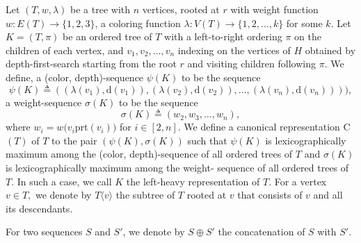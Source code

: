 \documentclass[12pt]{article}
\renewcommand{\d}{${\rm d}$}
\newcommand{\prt}{${\rm prt}$}
\newcommand{\1}{\pmb{1}}
\newcommand{\0}{\pmb{0}}
\renewcommand{\d}{\mathrm d}
\begin{document}
 
 Let $(T,w, \lambda)$ be a tree with $n$ vertices, 
 rooted at $r$ with weight function
 $w : E(T) \to \{1, 2, 3\}$, a  coloring function 
 $\lambda : V(T) \to \{1, 2, \ldots, k\}$ for some 
 $k$. 
Let $K= (T, \pi)$ be an ordered tree of $T$ with a left-to-right ordering $\pi$ 
on the children of each vertex, and 
$v_1, v_2, \ldots, v_n$ indexing on the vertices of $H$ obtained by 
depth-first-search starting from the root $r$ and 
visiting children following $\pi$. 
We define, a (color, depth)-sequence $\psi(K)$ to be the sequence
\[
\psi(K) \triangleq (( \lambda(v_1), \d(v_1)), (\lambda(v_2), \d(v_2)), \ldots, (\lambda(v_n), \d(v_n)))), 
\]
a weight-sequence $\sigma(K)$ to be the sequence 
$$
\sigma(K) \triangleq (w_2, w_3,\ldots, w_n), 
$$ where 
$w_i = w(v_i\prt(v_i))$ for $i \in [2, n]$.
We define a canonical representation C$(T)$ of $T$ to the pair 
$(\psi(K), \sigma(K))$ such that $\psi(K)$ is lexicographically maximum among  
the (color, depth)-sequence of all ordered trees of $T$ and 
$\sigma(K)$ is lexicographically maximum among the 
weight- sequence of all ordered trees of $T$. 
In such a case, we call $K$ the left-heavy representation of $T$. 
For a vertex $v \in T,$ we denote by $T\langle v \rangle$ the subtree of $T$ rooted at $v$ that consists of $v$ and all its 
descendants. 

For two sequences $S$ and $S'$, we denote by 
$S \oplus  S'$ the concatenation of $S$ with $S'$. 
 
\end{document}
